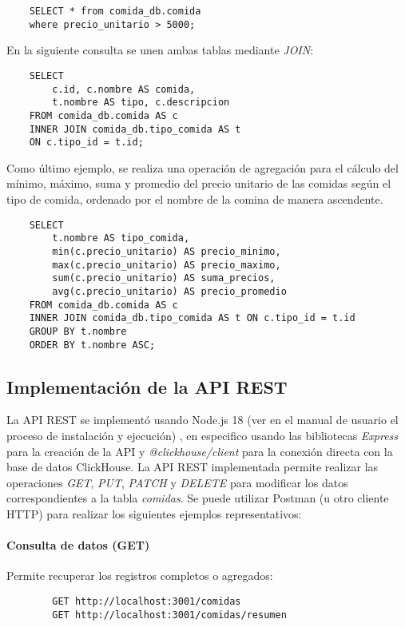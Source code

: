 \begin{verbatim}
    SELECT * from comida_db.comida 
    where precio_unitario > 5000;
\end{verbatim}
En la siguiente consulta se unen ambas tablas mediante \emph{JOIN}:
\begin{verbatim}
    SELECT
        c.id, c.nombre AS comida,
        t.nombre AS tipo, c.descripcion
    FROM comida_db.comida AS c
    INNER JOIN comida_db.tipo_comida AS t
    ON c.tipo_id = t.id;
\end{verbatim}
Como último ejemplo, se realiza una operación de agregación para el cálculo del mínimo, máximo, suma y promedio del precio unitario de las comidas según el tipo de comida, ordenado por el nombre de la comina de manera ascendente. 
\begin{verbatim}
    SELECT
        t.nombre AS tipo_comida,
        min(c.precio_unitario) AS precio_minimo,
        max(c.precio_unitario) AS precio_maximo,
        sum(c.precio_unitario) AS suma_precios,
        avg(c.precio_unitario) AS precio_promedio
    FROM comida_db.comida AS c
    INNER JOIN comida_db.tipo_comida AS t ON c.tipo_id = t.id
    GROUP BY t.nombre
    ORDER BY t.nombre ASC;
\end{verbatim}



\subsection{Implementación de la API REST}
La API REST se implementó usando Node.js 18 (ver en el manual de usuario el proceso de instalación y ejecución) \parencite{node_docker}, en especifico usando las bibliotecas \emph{Express} para la creación de la API y \emph{@clickhouse/client} para la conexión directa con la base de datos ClickHouse. La API REST implementada permite realizar las operaciones \emph{GET}, \emph{PUT}, \emph{PATCH} y \emph{DELETE} para modificar los datos correspondientes a la tabla \emph{comidas}. Se puede utilizar Postman (u otro cliente HTTP) para realizar los siguientes ejemplos representativos:

\paragraph{Consulta de datos (GET)}  
Permite recuperar los registros completos o agregados:
\begin{verbatim}
        GET http://localhost:3001/comidas
        GET http://localhost:3001/comidas/resumen
\end{verbatim}

